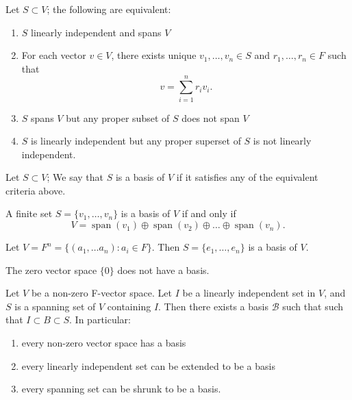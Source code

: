 \documentclass{scrartcl}
\def\B{\mathcal{B}}
\DeclareMathOperator{\spn}{span}  %
\begin{document}
\begin{theorem}
	Let $S \subset V$; the following are equivalent:
	\begin{enumerate}
		\item $S$ linearly independent and spans $V$
		\item For each vector $v\in V$, there exists unique $v_1, \dots, v_n \in S$ and $r_1, \dots, r_n \in F$ such that
		\[v=\sum_{i=1}^n r_iv_i.\]
		\item $S$ spans $V$ but any proper subset of $S$ does not span $V$
		\item $S$ is linearly independent but any proper superset of $S$ is not linearly independent.
	\end{enumerate}
\end{theorem}
\iffalse
\begin{proof}
	It is clearly that 1. and 2. are equivalent. 
	\par $(i) \implies (iii)$: Suppose $S' \subsetneq S$ is a spanning set of $V$. Then any vector in $S-S'$ can be written as a linear combination of vectors in $S'$. Pick $v \in S-S'$, then
	\[v = \sum_{i=1}^n a'_i v'_i\]
	where $v'_i \in S' \subsetneq S$, contradicting the linear independence of $S$.
	\par $(iii) \implies (i)$: Suppose $S$ is not linearly independent. Then we can find $v\in S$ such that $v \in \spn(S-\{v\})$, which implies that
	\[V = \spn{S} = \spn(S-\{v\}), \]
	so we has found a proper subset of $S$ that spans $V$.
\end{proof}
\fi
\begin{definition}
	Let $S \subset V$; We say that $S$ is a basis of $V$ if it satisfies any of the equivalent criteria above. 
\end{definition}
\begin{corollary}
	A finite set $S = \{v_1, \dots, v_n\}$ is a basis of $V$ if and only if
	\[V = \spn(v_1) \oplus \spn(v_2) \oplus \dots \oplus \spn(v_n).\]
\end{corollary}
\begin{example}
	Let $V = F^n = \{(a_1, \dots a_n): a_i \in F\}$. Then $S = \{e_1, \dots, e_n\}$ is a basis of $V$.
\end{example}
\begin{remark}
	The zero vector space $\{0\}$ does not have a basis. 
\end{remark}
\begin{theorem}
	Let $V$ be a non-zero F-vector space. Let $I$ be a linearly independent set in $V$, and $S$ is a spanning set of $V$ containing $I$. Then there exists a basis $\B$ such that such that $I \subset B \subset S$. In particular:
	\begin{enumerate}
		\item every non-zero vector space has a basis
		\item every linearly independent set can be extended to be a basis
		\item every spanning set can be shrunk to be a basis.
	\end{enumerate}
\end{theorem}
\end{document}
